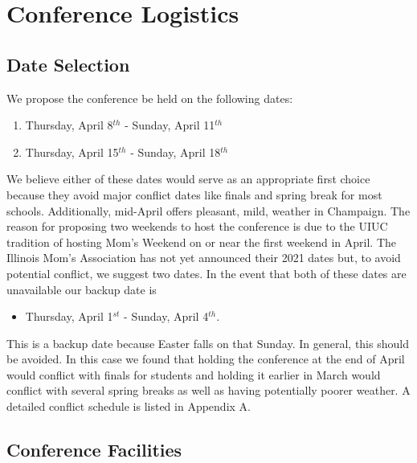 
\section{Conference Logistics}

\subsection{Date Selection}


We propose the conference be held on the following dates: 
\begin{enumerate}
	\item Thursday, April 8$^{th}$ - Sunday, April 11$^{th}$ 
	\item Thursday, April 15$^{th}$ - Sunday, April 18$^{th}$
\end{enumerate}
We believe either of these dates would serve as an appropriate first choice because they avoid major conflict dates like finals and spring break for most schools. Additionally, mid-April offers pleasant, mild, weather in Champaign. The reason for proposing two weekends to host the conference is due to the UIUC tradition of hosting Mom's Weekend on or near the first weekend in April. The Illinois Mom's Association has not yet announced their 2021 dates but, to avoid potential conflict, we suggest two dates. In the event that both of these dates are unavailable our backup date is 
\begin{itemize}
	\item Thursday, April 1$^{st}$ - Sunday, April 4$^{th}$.  
\end{itemize}
This is a backup date because Easter falls on that Sunday. In general, this should be avoided. In this case we found that holding the conference at the end of April would conflict with finals for students and holding it earlier in March would conflict with several spring breaks as well as having potentially poorer weather. A detailed conflict schedule is listed in Appendix A. 

\subsection{Conference Facilities}

